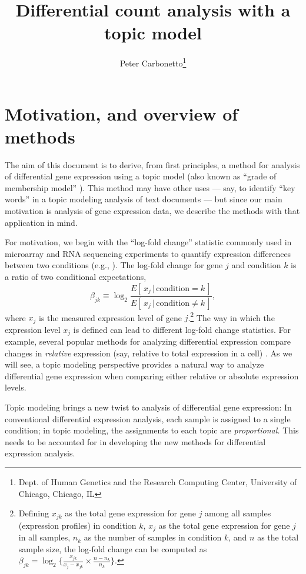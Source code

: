 \documentclass[final]{siamart171218}
\title{Differential count analysis with a topic model}
\author{Peter Carbonetto\thanks{Dept. of Human Genetics and the Research Computing Center, University of Chicago, Chicago, IL}}
\begin{document}
\maketitle

\section{Motivation, and overview of methods}

The aim of this document is to derive, from first principles, a method
for analysis of differential gene expression using a topic model (also
known as ``grade of membership model'' \cite{dey-2017}). This method
may have other uses --- say, to identify ``key words'' in a topic
modeling analysis of text documents --- but since our main motivation
is analysis of gene expression data, we describe the methods with that
application in mind.

For motivation, we begin with the ``log-fold change'' statistic
commonly used in microarray and RNA sequencing experiments to quantify
expression differences between two conditions (e.g.,
\cite{cui-churchill-2003, quackenbush-2002}). The log-fold change for
gene $j$ and condition $k$ is a ratio of two conditional expectations,
\begin{equation}
\beta_{jk} \equiv
\log_2 \frac{E[\,x_j \,|\, \mathrm{condition} = k\,]}
            {E[\,x_j \,|\, \mathrm{condition} \neq k\,]},
\label{eq:lfc}
\end{equation}
where $x_j$ is the measured expression level of gene
$j$.\footnote{Defining $x_{jk}$ as the total gene expression for gene
  $j$ among all samples (expression profiles) in condition $k$, $x_j$
  as the total gene expression for gene $j$ in all samples, $n_k$ as
  the number of samples in condition $k$, and $n$ as the total sample
  size, the log-fold change can be computed as $\beta_{jk} = \log_2
  \Big\{ \frac{x_{jk}}{x_j - x_{jk}} \times \frac{n - n_k}{n_k}
  \Big\}$.} The way in which the expression level $x_j$ is defined can
lead to different log-fold change statistics. For example, several
popular methods for analyzing differential expression compare changes
in {\em relative} expression (say, relative to total expression in a
cell) \cite{bullard-2010, voom, DESeq2, edgeR}. As we will see, a
topic modeling perspective provides a natural way to analyze
differential gene expression when comparing either relative or
absolute expression levels.

Topic modeling brings a new twist to analysis of differential gene
expression: In conventional differential expression analysis, each
sample is assigned to a single condition; in topic modeling, the
assignments to each topic are {\em proportional.} This needs to be
accounted for in developing the new methods for differential
expression analysis.
\end{document}
